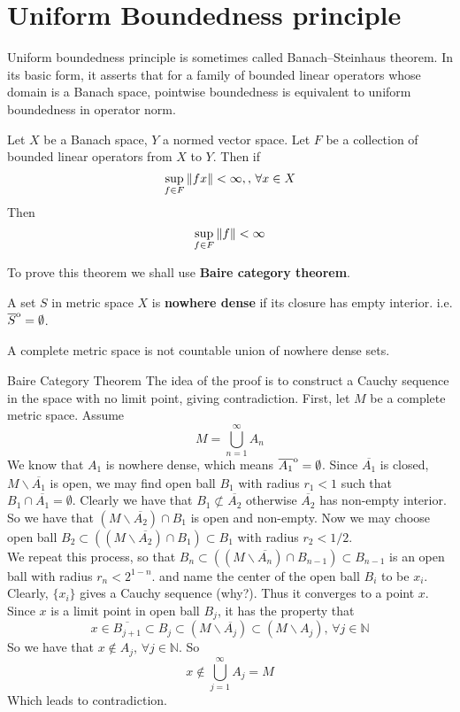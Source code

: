 \newpage
\section{Uniform Boundedness principle}
Uniform boundedness principle is sometimes called Banach–Steinhaus theorem. In its basic form, it asserts that for a family of bounded linear operators  whose domain is a Banach space, pointwise boundedness is equivalent to uniform boundedness in operator norm.

\begin{theorem}\label{UBP}\rm\nextline
	Let $X$ be a Banach space, $Y$ a normed vector space. Let $F$ be a collection of bounded linear operators from $X$ to $Y$. Then if
	$$
		\sup_{f\in F}\left\|{fx}\right\|<\infty,,\,\forall x\in X
	$$
	Then
	$$
		\sup_{f\in F}\left\|{f}\right\|<\infty
	$$
\end{theorem}
To prove this theorem we shall use {\textbf{Baire category theorem}}.

\begin{definition}\rm\nextline
	A set $S$ in metric space $X$ is {\bf nowhere dense} if its closure has empty interior. i.e. $\overline{S}\strut^\mathrm{o}=\emptyset$.
\end{definition}

\begin{theorem}\label{BCT}\rm\nextline
	A complete metric space is not countable union of nowhere dense sets.
\begin{pf}{Baire Category Theorem}{}
	The idea of the proof is to construct a Cauchy sequence in the space with no limit point, giving contradiction. First, let $M$ be a complete metric space. Assume
	$$M=\bigcup_{n=1}^\infty A_n$$
	We know that $A_1$ is nowhere dense, which means $\overline{A_1}\strut^\mathrm{o}=\emptyset$. Since $\overline{A_1}$ is closed, $M\backslash \overline{A_1}$ is open, we may find open ball $B_1$ with radius $r_1<1$ such that $B_1\cap\overline{A_1}=\emptyset$. Clearly we have that $B_1\not\subset\overline{A_2}$ otherwise $\overline{A_2}$ has non-empty interior. So we have that $(M\backslash\overline{A_2})\cap B_1$ is open and non-empty. Now we may choose open ball $B_2\subset((M\backslash\overline{A_2})\cap B_1)\subset B_1$ with radius $r_2<1/2$. \\
	We repeat this process, so that $B_n\subset((M\backslash\overline{A_n})\cap B_{n-1})\subset B_{n-1}$ is an  open ball with radius $r_n<2^{1-n}$. and name the center of the open ball $B_i$ to be $x_i$. Clearly, $\{x_i\}$ gives a Cauchy sequence (why?). Thus it converges to a point $x$. Since $x$ is a limit point in open ball $B_j$, it has  the property that
	$$x\in \overline{B_{j+1}}\subset B_j\subset (M\backslash\overline{A_j})\subset(M\backslash A_j),\,\forall j\in\mathbb{N}$$
	So we have that $x\not\in A_j,\,\forall j\in\mathbb{N}$.
	So
	$$
		x\not\in \bigcup_{j=1}^{\infty}A_j=M
	$$
	Which leads to contradiction.
	\end{pf}
\end{theorem}

